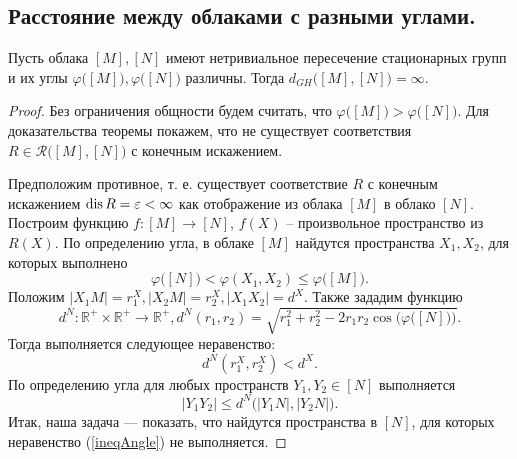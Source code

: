 \subsection{Расстояние между облаками с разными углами.}
\begin{theorem}
  \label{thm:diffAndDist}
  Пусть облака \( [M], [N] \) имеют нетривиальное пересечение
  стационарных групп и их углы \( \varphi \big([M]\big), \varphi
  \big([N]\big) \) различны. Тогда \( d_{GH} \big([M], [N]\big) =
  \infty \).
\end{theorem}
\begin{proof}
  Без ограничения общности будем считать, что \( \varphi \big([M]\big)>
  \varphi \big([N]\big) \). Для доказательства теоремы покажем, что не
  существует соответствия \( R\in \mathcal{R}\big([M],[N]\big) \) с
  конечным искажением.

  Предположим противное, т. е. существует соответствие \( R \) с
  конечным искажением \( \operatorname{dis} R = \varepsilon < \infty \) как
  отображение из облака \( [M] \) в облако \( [N] \). Построим функцию
  \( f \colon [M] \rightarrow [N] \), \( f(X) \) -- произвольное
  пространство из \(
    R(X)
  \). По определению угла, в облаке \( [M] \) найдутся пространства \(
  X_1, X_2 \), для которых выполнено
  \[
    \varphi \big([N]\big) < \varphi (X_1, X_2) \le \varphi
  \big([M]\big). \]
  Положим \( |X_1 M| = r_1^X,  |X_2 M| = r_2^X, | X_1 X_2 | = d^X\).
  Также зададим функцию
  \[ d^N \colon \mathbb{R}^+ \times \mathbb{R}^+ \rightarrow
    \mathbb{R}^+, d^N(r_1, r_2) =
    \sqrt{r_1^2 + r_2^2 - 2r_1r_2\cos\Big(\varphi \big([N]\big)\Big)}.
  \]
  Тогда выполняется следующее неравенство:
  \begin{equation}
    d^N(r_1^X, r_2^X) < d^X.
    \label{ineqdx}
  \end{equation}
  По определению угла для любых пространств \( Y_1, Y_2 \in [N] \)
  выполняется
  \begin{equation}
    | Y_1 Y_2 | \le d^N\big(| Y_1N |, | Y_2N |\big). \label{ineqAngle}
  \end{equation}
  Итак, наша задача --- показать, что найдутся пространства в \( [N]
  \), для которых неравенство (\ref{ineqAngle}) не выполняется.


\end{proof}

